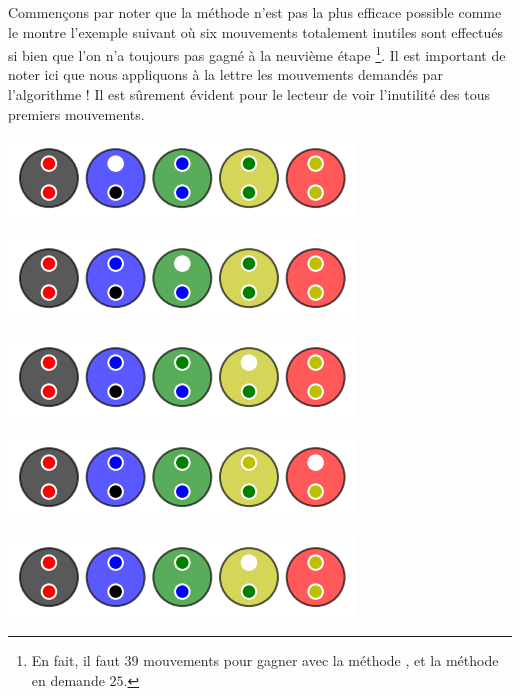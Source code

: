 Commençons par noter que la méthode  n'est pas la plus efficace possible comme le montre l'exemple suivant où six mouvements totalement inutiles sont effectués si bien que l'on n'a toujours pas gagné à la neuvième étape
\footnote{
    En fait, il faut $39$ mouvements pour gagner avec la méthode , et la méthode  en demande $25$.
}. Il est important de noter ici que nous appliquons à la lettre les mouvements demandés par l'algorithme ! Il est sûrement évident pour le lecteur de voir l'inutilité des tous premiers mouvements.

\vspace{-0.4em}
\begin{multicols}{2}
    \begin{center}   %
        \includegraphics[scale= 0.45]{content/optimal/where_do_we_go/algo_bubble/000.png}

        \includegraphics[scale= 0.45]{content/optimal/where_do_we_go/algo_bubble/001.png}

        \includegraphics[scale= 0.45]{content/optimal/where_do_we_go/algo_bubble/002.png}

        \includegraphics[scale= 0.45]{content/optimal/where_do_we_go/algo_bubble/003.png}

        \includegraphics[scale= 0.45]{content/optimal/where_do_we_go/algo_bubble/004.png}
    \end{center}


\end{multicols}
